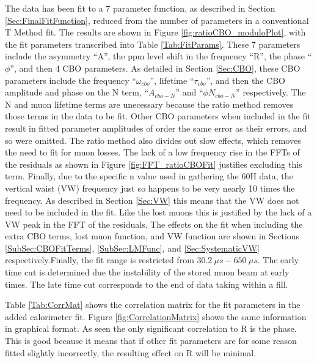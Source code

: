 	The data has been fit to a 7 parameter function, as described in Section \ref{Sec:FinalFitFunction}, reduced from the number of parameters in a conventional T Method fit. The results are shown in Figure \ref{fig:ratioCBO_moduloPlot}, with the fit parameters transcribed into Table \ref{Tab:FitParams}. These 7 parameters include the asymmetry ``A'', the ppm level shift in the \gmtwo frequency ``R'', the \gmtwo phase ``$\phi$'', and then 4 CBO parameters. As detailed in Section \ref{Sec:CBO}, these CBO parameters include the frequency ``$\omega_{cbo}$'', lifetime ``$\tau_{cbo}$'', and then the CBO amplitude and phase on the N term, ``$A_{cbo-N}$'' and ``$\phi{N}_{cbo-N}$'' respectively. The N and muon lifetime terms are unecessary because the ratio method removes those terms in the data to be fit. Other CBO parameters when included in the fit result in fitted parameter amplitudes of order the same error as their errors, and so were omitted. The ratio method also divides out slow effects, which removes the need to fit for muon losses. The lack of a low frequency rise in the FFTs of the residuals as shown in Figure \ref{fig:FFT_ratioCBOFit} justifies excluding this term. Finally, due to the specific n value used in gathering the 60H data, the vertical waist (VW) frequency just so happens to be very nearly 10 times the \gmtwo frequency. As described in Section \ref{Sec:VW} this means that the VW does not need to be included in the fit. Like the lost muons this is justified by the lack of a VW peak in the FFT of the residuals. The effects on the fit when including the extra CBO terms, lost muon function, and VW function are shown in Sections \ref{SubSec:CBOFitTerms}, \ref{SubSec:LMFunc}, and \ref{Sec:SystematicVW} respectively.Finally, the fit range is restricted from $\SI{30.2}{\mu s} - \SI{650}{\mu s}$. The early time cut is determined due the instability of the stored muon beam at early times. The late time cut corresponds to the end of data taking within a fill.

	Table \ref{Tab:CorrMat} shows the correlation matrix for the fit parameters in the added calorimeter fit. Figure \ref{fig:CorrelationMatrix} shows the same information in graphical format. As seen the only significant correlation to R is the \gmtwo phase. This is good because it means that if other fit parameters are for some reason fitted slightly incorrectly, the resulting effect on R will be minimal.

